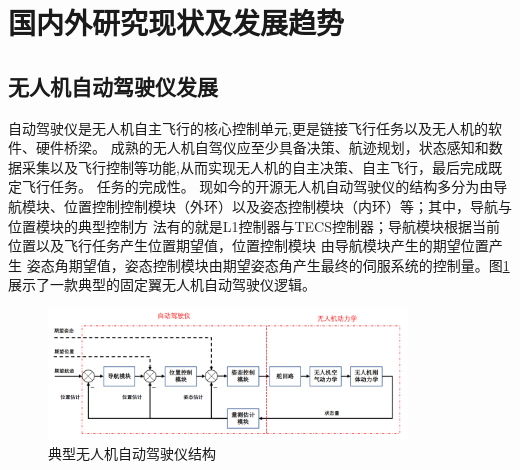 \section{国内外研究现状及发展趋势}
\subsection{无人机自动驾驶仪发展}
自动驾驶仪是无人机自主飞行的核心控制单元,更是链接飞行任务以及无人机的软件、硬件桥梁。
成熟的无人机自驾仪应至少具备决策、航迹规划，状态感知和数据采集以及飞行控制等功能,从而实现无人机的自主决策、自主飞行，最后完成既定飞行任务。
任务的完成性。\cite{LiuLi2010}
现如今的开源无人机自动驾驶仪的结构多分为由导航模块、位置控制控制模块（外环）以及姿态控制模块（内环）等；其中，导航与位置模块的典型控制方
法有的就是L1控制器\cite{Park_2004}与TECS控制器\cite{Lambregts1983Vertical}；导航模块根据当前位置以及飞行任务产生位置期望值，位置控制模块
由导航模块产生的期望位置产生
姿态角期望值，姿态控制模块由期望姿态角产生最终的伺服系统的控制量。图\ref{fig-c1-autopilot}展示了一款典型的固定翼无人机自动驾驶仪逻辑。
\begin{figure}[H]
    \centering
    \includegraphics[width=0.85\textwidth]{figures/c1/autopilot_struct}
    \caption{典型无人机自动驾驶仪结构}\label{fig-c1-autopilot}
\end{figure}
